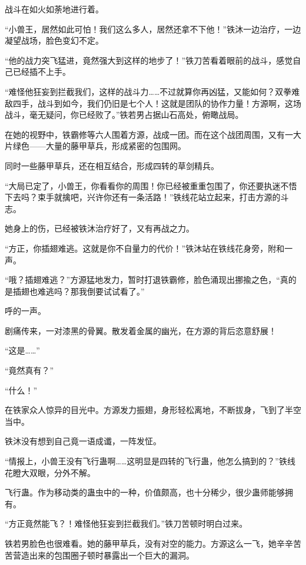 
\begin{this_body}

战斗在如火如荼地进行着。

“小兽王，居然如此可怕！我们这么多人，居然还拿不下他！”铁沐一边治疗，一边凝望战场，脸色变幻不定。

“他的战力突飞猛进，竟然强大到这样的地步了！”铁刀苦看着眼前的战斗，感觉自己已经插不上手。

“难怪他狂妄到拦截我们，这样的战斗力……不过就算你再凶猛，又能如何？双拳难敌四手，战斗到如今，我们仍旧是七个人！这就是团队的协作力量！方源啊，这场战斗，毫无疑问，你已经败了。”铁若男占据山石高处，俯瞰战局。

在她的视野中，铁霸修等六人围着方源，战成一团。而在这个战团周围，又有一大片绿色——大量的藤甲草兵，形成紧密的包围网。

同时一些藤甲草兵，还在相互结合，形成四转的草剑精兵。

“大局已定了，小兽王，你看看你的周围！你已经被重重包围了，你还要执迷不悟下去吗？束手就擒吧，兴许你还有一条活路！”铁线花站立起来，打击方源的斗志。

她身上的伤，已经被铁沐治疗好了，又有再战之力。

“方正，你插翅难逃。这就是你不自量力的代价！”铁沐站在铁线花身旁，附和一声。

“哦？插翅难逃？”方源猛地发力，暂时打退铁霸修，脸色涌现出挪揄之色，“真的是插翅也难逃吗？那我倒要试试看了。”

呼的一声。

剧痛传来，一对漆黑的骨翼。散发着金属的幽光，在方源的背后恣意舒展！

“这是……”

“竟然真有？”

“什么！”

在铁家众人惊异的目光中。方源发力振翅，身形轻松离地，不断拔身，飞到了半空当中。

铁沐没有想到自己竟一语成谶，一阵发怔。

“情报上，小兽王没有飞行蛊啊……这明显是四转的飞行蛊，他怎么搞到的？”铁线花瞪大双眼，分外不解。

飞行蛊。作为移动类的蛊虫中的一种，价值颇高，也十分稀少，很少蛊师能够拥有。

“方正竟然能飞？！难怪他狂妄到拦截我们。”铁刀苦顿时明白过来。

铁若男脸色也很难看。她的藤甲草兵，没有对空的能力。方源这么一飞，她辛辛苦苦营造出来的包围圈子顿时暴露出一个巨大的漏洞。


\end{this_body}
